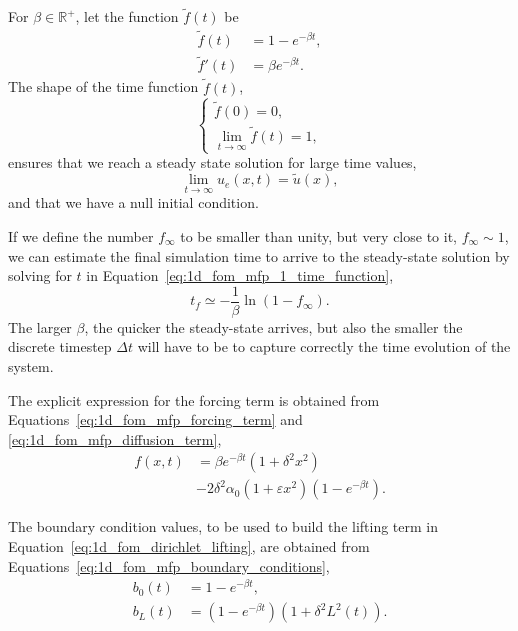 \documentclass[../main.tex]{subfiles}
\begin{document}
For $\beta \in \mathbb{R}^{+}$, let the function $\tilde{f}(t)$ be
\begin{subequations}
    \begin{align}
        \tilde{f}(t) &= 1 - e^{-\beta t}, \label{eq:1d_fom_mfp_1_time_function}\\
        \tilde{f}'(t) &= \beta e^{-\beta t}.
    \end{align}
\end{subequations}
The shape of the time function $\tilde{f}(t)$,
\begin{equation*}
    \begin{cases}
    \tilde{f}(0) = 0, \\ 
    \lim_{t \rightarrow \infty} \tilde{f}(t) = 1,
    \end{cases}
\end{equation*}
ensures that we reach a steady state solution for large time values,
\begin{equation}
    \lim_{t\rightarrow \infty} u_e(x,t) = \tilde{u}(x),
\end{equation}
and that we have a null initial condition.

If we define the number $f_\infty$ to be smaller than unity, but very close to it, $f_\infty \sim 1$, we can estimate the final simulation time to arrive to the steady-state solution by solving for $t$ in Equation~\eqref{eq:1d_fom_mfp_1_time_function},
\begin{equation}
    t_f \simeq - \frac{1}{\beta} \ln(1 - f_\infty).
\end{equation}
The larger $\beta$, the quicker the steady-state arrives, but also the smaller the discrete timestep $\Delta t$ will have to be to capture correctly the time evolution of the system.

The explicit expression for the forcing term is obtained from Equations~\eqref{eq:1d_fom_mfp_forcing_term} and \eqref{eq:1d_fom_mfp_diffusion_term},
\begin{equation}
    \begin{split}
        f(x,t) &= \beta e^{-\beta t} (1+\delta^2 x^2) \\
        &- 2 \delta^2 \alpha_0(1 + \varepsilon x^2) \left(1 - e^{-\beta t}\right).    
    \end{split}
\end{equation}

The boundary condition values, to be used to build the lifting term in Equation~\eqref{eq:1d_fom_dirichlet_lifting}, are obtained from Equations~\eqref{eq:1d_fom_mfp_boundary_conditions},
\begin{subequations}
    \begin{align}
        b_0(t) &= 1 - e^{-\beta t}, \\
        b_L(t) &= \left(1 - e^{-\beta t}\right)\left(1 + \delta^2 L^{2}(t)\right).
    \end{align}
\end{subequations}
\end{document}
